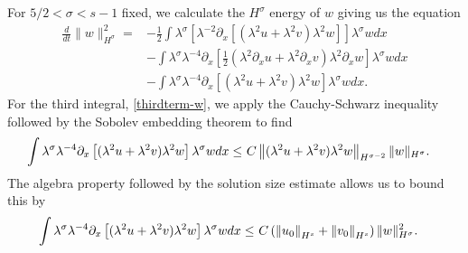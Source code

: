 \documentclass[reqno]{amsart}
\theoremstyle{plain}
\numberwithin{equation}{section}
\begin{document}
For $5/2<\sigma<s-1 $
 fixed, we calculate the $H^\sigma$ energy of $w$ giving us the equation 
 \begin{align}    
 \frac{d}{dt} \| w\|_{H^\sigma}^2 =& -   \frac12 \int \lambda^\sigma \left[ \lambda^{-2}\partial_x  \left[ (\lambda^2 u +\lambda^2 v) \lambda^2   w   \right]  \right]   \lambda^\sigma w dx 
     \label{firstterm-w}
 \\ & 
  - \int \lambda^\sigma \lambda^{-4}  \partial_x \left[  \frac12  ( \lambda^2 \partial_x u +\lambda^2  \partial_xv) \lambda^2  \partial_x w   \right ]    \lambda^\sigma w dx
    \label{secondterm-w}
  \\ &
 - \int \lambda^\sigma \lambda^{-4}  \partial_x \left[   
  (\lambda^2 u +\lambda^2v)\lambda^2   w     \right ]    \lambda^\sigma w dx .
  \label{thirdterm-w}
\end{align}
For the third integral, \eqref{thirdterm-w}, we apply the Cauchy-Schwarz inequality followed by the Sobolev embedding theorem to find 
 \begin{align}    \notag 
 \int \lambda^\sigma \lambda^{-4}  \partial_x \left[   
  (\lambda^2 u +\lambda^2v)\lambda^2   w     \right ]    \lambda^\sigma w dx  
 \le &\
  C 
  \left\| (\lambda^2 u +\lambda^2v)\lambda^2   w
  \right\| _{H^{\sigma-2} } 
  \|w\|_{H^\sigma} .
\end{align}
The algebra property followed by the solution size estimate allows us to bound this by 
 \begin{align}    \notag 
 \int \lambda^\sigma \lambda^{-4}  \partial_x \left[   
  (\lambda^2 u +\lambda^2v)\lambda^2   w     \right ]    \lambda^\sigma w dx  
 \le & \
  C 
 \left(  \left\| u_0   \right\| _{H^{s} }  +  \left\| v_0   \right\| _{H^{s} } \right)  
  \|w\|_{H^\sigma} ^2 .
\end{align}
\end{document}
